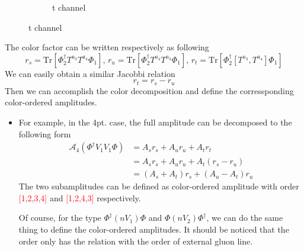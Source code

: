 \documentclass{beamer}
\begin{document}
\begin{frame}
\begin{itemize}
\begin{figure}
\begin{subfigure}{0.3\textwidth}
              \caption{t channel}
            \end{subfigure}
          \end{figure}
        The color factor can be written respectively as following
        \begin{equation*}
            r_s=\mathrm{Tr}[\Phi_2^\dagger T^{a_3}T^{a_4}\Phi_1],\,r_u=\mathrm{Tr}[\Phi_2^\dagger T^{a_4}T^{a_3}\Phi_1],\,
            r_t=\mathrm{Tr}[\Phi_2^\dagger [T^{a_3},T^{a_4}]\Phi_1]
        \end{equation*}
        We can easily obtain a similar Jacobbi relation
        \begin{equation*}
            r_t=r_s-r_u
        \end{equation*}
        Then we can accomplish the color decomposition and define the corressponding color-ordered amplitudes.
    \end{itemize}
\end{frame}

\begin{frame}
    \begin{itemize}
        \item[] For example, in the 4pt. case, the full amplitude can be decomposed to the following form
        \begin{align*}
            \mathcal{A}_4(\Phi^\dagger V_1V_1\Phi)&=A_s r_s+A_u r_u+A_t r_t\\
            &=A_s r_s+A_u r_u+A_t(r_s-r_u)\\
            &=(A_s+A_t)r_s+(A_u-A_t)r_u
        \end{align*}
        The two subamplitudes can be defined as color-ordered amplitude with order \textcolor{red}{[1,2,3,4]} and 
        \textcolor{red}{[1,2,4,3]} respectively.

        \vspace{0.5em}
        Of course, for the type $\Phi^\dagger(nV_1)\Phi$ and $\Phi (nV_2) \Phi^\dagger$, we can do the same thing to define the color-ordered amplitudes.
        It should be noticed that the order only has the relation with the order of external gluon line.
        \begin{equation*}
            [1,2,\sigma(3),\sigma(4),\cdots,\sigma(n)]
        \end{equation*}
    \end{itemize}
\end{frame}
\end{document}
